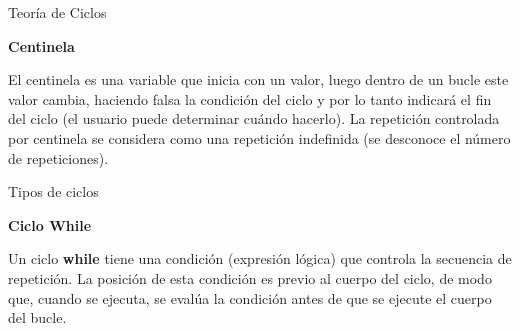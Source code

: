 \begin{frame}{Teoría de Ciclos}
    \begin{center}\textbf{Centinela}\end{center}
    \hspace{5mm}
    El centinela es una variable que inicia con un valor, luego dentro de un bucle este valor cambia, haciendo falsa la condición del ciclo y por lo tanto indicará el fin del ciclo (el usuario puede determinar cuándo hacerlo). La repetición controlada por centinela se considera como una repetición indefinida (se desconoce el número de repeticiones).
\end{frame}



\begin{frame}{Tipos de ciclos}

    \begin{center}\textbf{Ciclo While}\end{center}
    \hspace{5mm}
    Un ciclo \textbf{while} tiene una condición (expresión lógica) que controla la secuencia de repetición. La posición de esta condición es previo al cuerpo del ciclo, de modo que, cuando se ejecuta, se evalúa la condición antes de que se ejecute el cuerpo del bucle.
\end{frame}



